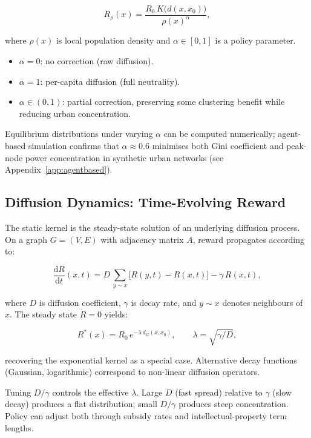 \documentclass[12pt,a4paper]{article}
\theoremstyle{definition}
\newcommand{\ddt}[1]{\frac{\mathrm{d}#1}{\mathrm{d}t}}
\begin{document}
\begin{equation}
  R_\rho(x) = \frac{R_0\,K\!\bigl(d(x,x_0)\bigr)}{\rho(x)^\alpha},
  \label{eq:densitycorrection}
\end{equation}

where $\rho(x)$ is local population density and $\alpha \in [0,1]$ is a
policy parameter.

\begin{itemize}[leftmargin=*]
  \item $\alpha = 0$: no correction (raw diffusion).
  \item $\alpha = 1$: per-capita diffusion (full neutrality).
  \item $\alpha \in (0,1)$: partial correction, preserving some clustering
    benefit while reducing urban concentration.
\end{itemize}

Equilibrium distributions under varying $\alpha$ can be computed numerically;
agent-based simulation confirms that $\alpha \approx 0.6$ minimises both
Gini coefficient and peak-node power concentration in synthetic urban networks
(see Appendix~\ref{app:agentbased}).

\subsection{Diffusion Dynamics: Time-Evolving Reward}

The static kernel is the steady-state solution of an underlying diffusion
process.  On a graph $G = (V, E)$ with adjacency matrix $A$, reward
propagates according to:

\begin{equation}
  \ddt{R}(x,t) = D\,\sum_{y \sim x} \bigl[R(y,t) - R(x,t)\bigr]
               - \gamma\,R(x,t),
  \label{eq:diffusion}
\end{equation}

where $D$ is diffusion coefficient, $\gamma$ is decay rate, and $y \sim x$
denotes neighbours of $x$.  The steady state $\dot{R} = 0$ yields:

\begin{equation}
  R^*(x) = R_0\,e^{-\lambda\,d_G(x,x_0)}, \qquad
  \lambda = \sqrt{\gamma / D},
\end{equation}

recovering the exponential kernel as a special case.  Alternative decay
functions (Gaussian, logarithmic) correspond to non-linear diffusion operators.

\begin{tcolorbox}[policybox]
  Tuning $D/\gamma$ controls the effective $\lambda$.  Large $D$ (fast spread)
  relative to $\gamma$ (slow decay) produces a flat distribution; small
  $D/\gamma$ produces steep concentration.  Policy can adjust both through
  subsidy rates and intellectual-property term lengths.
\end{tcolorbox}
\end{document}
